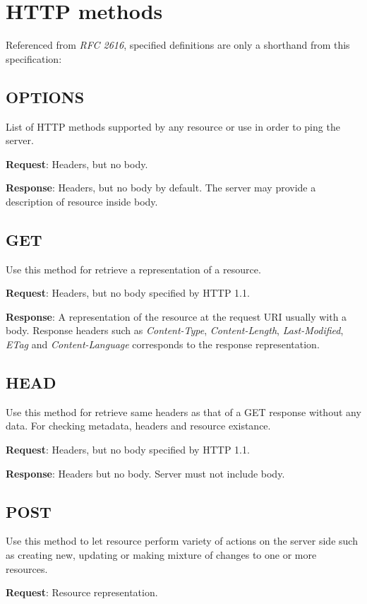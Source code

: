 \documentclass[11pt,a4paper]{article}
\begin{document}
\section{HTTP methods}
Referenced from \textit{RFC 2616}, specified definitions are only a shorthand from this specification:

\subsection{OPTIONS}
List of HTTP methods supported by any resource or use in order to ping the server.

\textbf{Request}: Headers, but no body.

\textbf{Response}: Headers, but no body by default. The server may provide a description of resource inside body.

\subsection{GET}
Use this method for retrieve a representation of a resource.

\textbf{Request}: Headers, but no body specified by HTTP 1.1.

\textbf{Response}: A representation of the resource at the request URI usually with a body. Response headers such as \textit{Content-Type}, \textit{Content-Length}, \textit{Last-Modified}, \textit{ETag} and \textit{Content-Language} corresponds to the response representation.

\subsection{HEAD}
Use this method for retrieve same headers as that of a GET response without any data. For checking metadata, headers and resource existance.

\textbf{Request}: Headers, but no body specified by HTTP 1.1.

\textbf{Response}: Headers but no body. Server must not include body.

\subsection{POST}
Use this method to let resource perform variety of actions on the server side such as creating new, updating or making mixture of changes to one or more resources.

\textbf{Request}: Resource representation.
\end{document}
